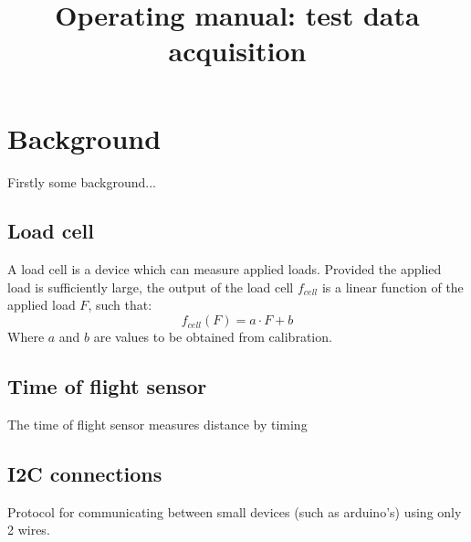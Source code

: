\documentclass{article}
\title{Operating manual: test data acquisition}
\begin{document}
\maketitle
 \section{Background}
 Firstly some background...
 \subsection{Load cell}
 A load cell is a device which can measure applied loads. Provided the applied load is sufficiently large, the output of the load cell $f_{cell}$ is a linear function of the applied load $F$, such that:
 \begin{equation}
  f_{cell}(F) = a\cdot F + b
 \end{equation}
 Where $a$ and $b$ are values to be obtained from calibration.

 \subsection{Time of flight sensor}
 The time of flight sensor measures distance by timing
 \subsection{I2C connections}
 Protocol for communicating between small devices (such as arduino's) using only 2 wires.
\end{document}
